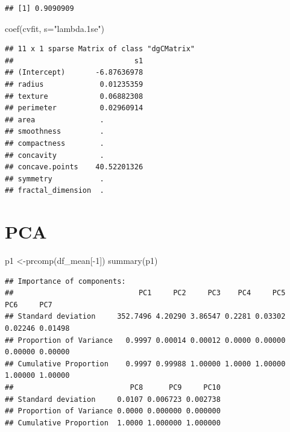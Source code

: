 \documentclass[
  11pt,
]{article}
\newenvironment{Shaded}{\begin{snugshade}}{\end{snugshade}}
\newcommand{\AttributeTok}[1]{\textcolor[rgb]{0.77,0.63,0.00}{#1}}
\newcommand{\DecValTok}[1]{\textcolor[rgb]{0.00,0.00,0.81}{#1}}
\newcommand{\FunctionTok}[1]{\textcolor[rgb]{0.00,0.00,0.00}{#1}}
\newcommand{\NormalTok}[1]{#1}
\newcommand{\OtherTok}[1]{\textcolor[rgb]{0.56,0.35,0.01}{#1}}
\newcommand{\SpecialCharTok}[1]{\textcolor[rgb]{0.00,0.00,0.00}{#1}}
\newcommand{\StringTok}[1]{\textcolor[rgb]{0.31,0.60,0.02}{#1}}
\begin{document}
\begin{Shaded}
\end{Shaded}

\begin{verbatim}
## [1] 0.9090909
\end{verbatim}

\begin{Shaded}
\begin{Highlighting}[]
\FunctionTok{coef}\NormalTok{(cvfit, }\AttributeTok{s=}\StringTok{"lambda.1se"}\NormalTok{)}
\end{Highlighting}
\end{Shaded}

\begin{verbatim}
## 11 x 1 sparse Matrix of class "dgCMatrix"
##                            s1
## (Intercept)       -6.87636978
## radius             0.01235359
## texture            0.06882308
## perimeter          0.02960914
## area               .         
## smoothness         .         
## compactness        .         
## concavity          .         
## concave.points    40.52201326
## symmetry           .         
## fractal_dimension  .
\end{verbatim}

\hypertarget{pca}{%
\section{PCA}\label{pca}}

\begin{Shaded}
\begin{Highlighting}[]
\NormalTok{p1 }\OtherTok{\textless{}{-}}\FunctionTok{prcomp}\NormalTok{(df\_mean[}\SpecialCharTok{{-}}\DecValTok{1}\NormalTok{])}
\FunctionTok{summary}\NormalTok{(p1)}
\end{Highlighting}
\end{Shaded}

\begin{verbatim}
## Importance of components:
##                             PC1     PC2     PC3    PC4     PC5     PC6     PC7
## Standard deviation     352.7496 4.20290 3.86547 0.2281 0.03302 0.02246 0.01498
## Proportion of Variance   0.9997 0.00014 0.00012 0.0000 0.00000 0.00000 0.00000
## Cumulative Proportion    0.9997 0.99988 1.00000 1.0000 1.00000 1.00000 1.00000
##                           PC8      PC9     PC10
## Standard deviation     0.0107 0.006723 0.002738
## Proportion of Variance 0.0000 0.000000 0.000000
## Cumulative Proportion  1.0000 1.000000 1.000000
\end{verbatim}
\end{document}
